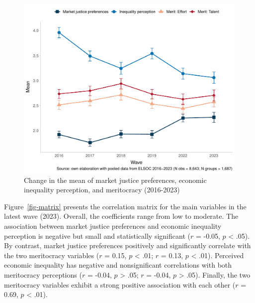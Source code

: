 \documentclass[
  12pt,
]{article}
\begin{document}
\begin{figure}[H]

{\centering \includegraphics[width=1\textwidth,height=\textheight]{paper_files/figure-pdf/fig-meanchange-1.pdf}

}

\caption{\label{fig-meanchange}Change in the mean of market justice
preferences, economic inequality perception, and meritocracy
(2016-2023)}

\end{figure}

Figure~\ref{fig-matrix} presents the correlation matrix for the main
variables in the latest wave (2023). Overall, the coefficients range
from low to moderate. The association between market justice preferences
and economic inequality perception is negative but small and
statistically significant (\(r\) = -0.05, \(p\) \textless{} .05). By
contrast, market justice preferences positively and significantly
correlate with the two meritocracy variables (\(r\) = 0.15, \(p\)
\textless{} .01; \(r\) = 0.13, \(p\) \textless{} .01). Perceived
economic inequality has negative and nonsignificant correlations with
both meritocracy perceptions (\(r\) = -0.04, \(p\) \textgreater{} .05;
\(r\) = -0.04, \(p\) \textgreater{} .05). Finally, the two meritocracy
variables exhibit a strong positive association with each other (\(r\) =
0.69, \(p\) \textless{} .01).
\end{document}
